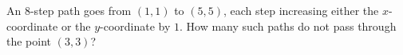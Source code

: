 An $8$-step path goes from $(1,1)$ to $(5,5)$, each step increasing either the $x$-coordinate or the $y$-coordinate by $1$. How many such paths do not pass through the point $(3,3)$?
